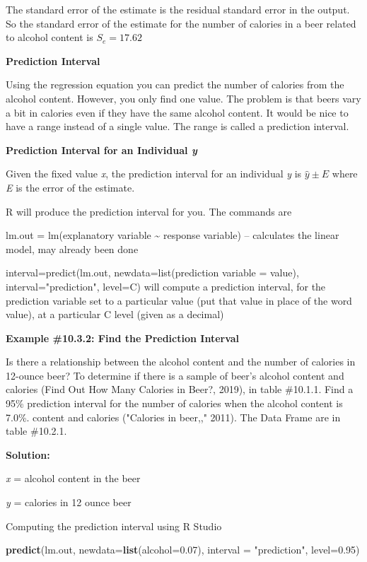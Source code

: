 \documentclass[]{book}
\newenvironment{Shaded}{\begin{snugshade}}{\end{snugshade}}
\newcommand{\DataTypeTok}[1]{\textcolor[rgb]{0.13,0.29,0.53}{#1}}
\newcommand{\FloatTok}[1]{\textcolor[rgb]{0.00,0.00,0.81}{#1}}
\newcommand{\KeywordTok}[1]{\textcolor[rgb]{0.13,0.29,0.53}{\textbf{#1}}}
\newcommand{\NormalTok}[1]{#1}
\newcommand{\StringTok}[1]{\textcolor[rgb]{0.31,0.60,0.02}{#1}}
\begin{document}
The standard error of the estimate is the residual standard error in the output. So the standard error of the estimate for the number of calories in a beer related to alcohol content is \(S_e=17.62\)

\textbf{Prediction Interval}

Using the regression equation you can predict the number of calories from the alcohol content. However, you only find one value. The problem is that beers vary a bit in calories even if they have the same alcohol content. It would be nice to have a range instead of a single value. The range is called a prediction interval.

\textbf{Prediction Interval for an Individual \emph{y} }

Given the fixed value \emph{x}, the prediction interval for an individual \emph{y} is \(\hat{y}\pm E\) where \emph{E} is the error of the estimate.

R will produce the prediction interval for you. The commands are

lm.out = lm(explanatory variable \textasciitilde{} response variable) -- calculates the linear model, may already been done

interval=predict(lm.out, newdata=list(prediction variable = value), interval="prediction", level=C) will compute a prediction interval, for the prediction variable set to a particular value (put that value
in place of the word value), at a particular C level (given as a decimal)

\textbf{Example \#10.3.2: Find the Prediction Interval}

Is there a relationship between the alcohol content and the number of calories in 12-ounce beer? To determine if there is a sample of beer's alcohol content and calories (Find Out How Many Calories in Beer?, 2019), in table \#10.1.1. Find a 95\% prediction interval for the number of calories when the alcohol content is 7.0\%.
content and calories ("Calories in beer,," 2011). The Data Frame are in
table \#10.2.1.

\textbf{Solution:}

\emph{x} = alcohol content in the beer

\emph{y} = calories in 12 ounce beer

Computing the prediction interval using R Studio

\begin{Shaded}
\begin{Highlighting}[]
\KeywordTok{predict}\NormalTok{(lm.out, }\DataTypeTok{newdata=}\KeywordTok{list}\NormalTok{(}\DataTypeTok{alcohol=}\FloatTok{0.07}\NormalTok{), }\DataTypeTok{interval =} \StringTok{"prediction"}\NormalTok{, }\DataTypeTok{level=}\FloatTok{0.95}\NormalTok{)}
\end{Highlighting}
\end{Shaded}
\end{document}
